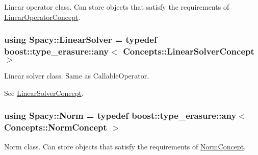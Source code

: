 Linear operator class. Can store objects that satisfy the requirements of \hyperlink{group__ConceptGroup_gaf0e18e41c434cfceb77ccb8e785a8055_LinearOperatorConceptAnchor}{Linear\+Operator\+Concept}. 

\label{group__SpacyGroup_ga584f7b9d82a844302ba0d77c3a1b6640_LinearOperatorAnchor}%
\hypertarget{group__SpacyGroup_ga584f7b9d82a844302ba0d77c3a1b6640_LinearOperatorAnchor}{}%
\hypertarget{namespaceSpacy_a7d5cd1c6fb9dd85aa345b536caf30bba_a7d5cd1c6fb9dd85aa345b536caf30bba}{}
\subsubsection[{Linear\+Solver}]{\setlength{\rightskip}{0pt plus 5cm}using {\bf Spacy\+::\+Linear\+Solver} = typedef boost\+::type\+\_\+erasure\+::any$<$ {\bf Concepts\+::\+Linear\+Solver\+Concept} $>$}\label{namespaceSpacy_a7d5cd1c6fb9dd85aa345b536caf30bba_a7d5cd1c6fb9dd85aa345b536caf30bba}


Linear solver class. Same as Callable\+Operator. 

\label{namespaceSpacy_a7d5cd1c6fb9dd85aa345b536caf30bba_LinearSolverAnchor}%
\hypertarget{namespaceSpacy_a7d5cd1c6fb9dd85aa345b536caf30bba_LinearSolverAnchor}{}%
See \hyperlink{group__ConceptGroup_gac7d6a94c7131c8613e2ab26fddeb50bd_LinearSolverConceptAnchor}{Linear\+Solver\+Concept}. \hypertarget{group__SpacyGroup_gaf4f33b11d657c48566d961a013c92bd1_gaf4f33b11d657c48566d961a013c92bd1}{}
\subsubsection[{Norm}]{\setlength{\rightskip}{0pt plus 5cm}using {\bf Spacy\+::\+Norm} = typedef boost\+::type\+\_\+erasure\+::any$<$ {\bf Concepts\+::\+Norm\+Concept} $>$}\label{group__SpacyGroup_gaf4f33b11d657c48566d961a013c92bd1_gaf4f33b11d657c48566d961a013c92bd1}


Norm class. Can store objects that satisfy the requirements of \hyperlink{group__ConceptGroup_ga8b6032c46f6e31840a2c956c6360549b_NormConceptAnchor}{Norm\+Concept}. 

\label{group__SpacyGroup_gaf4f33b11d657c48566d961a013c92bd1_NormAnchor}%
\hypertarget{group__SpacyGroup_gaf4f33b11d657c48566d961a013c92bd1_NormAnchor}{}%
\hypertarget{group__SpacyGroup_ga3f89622eba80cf840b2a7102f1303455_ga3f89622eba80cf840b2a7102f1303455}{}
